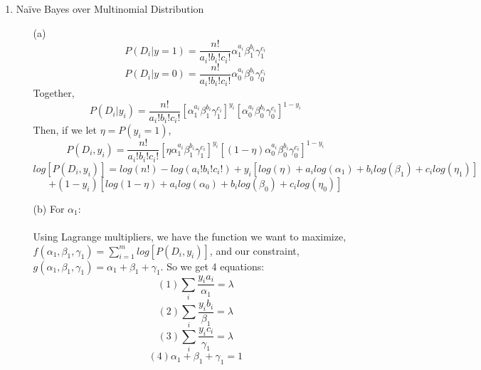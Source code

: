 \begin{enumerate}
\begin{enumerate}
  \item[(d)]
    No, they're not. You can't assign a probability of a label just given one feature by itself. For example, in this formulation, we assume that $P(x_1|0)$ is independent of $P(x_2|0)$. This means that $P(0|x_1)$ is independent of $P(0|x_2)$. But we can't really get the probability of a label given just one feature's information. A more fair calculation of $P(0|x_1)$ would include all of the other features' values. For example, if there were already 3 other features with values of 1, $P(0|x_1)$ should always be 0, regardless of the value of $x_1$. \\\\
In a more hand-wavy explanation, because the value is just dependent on a certain threshold number of features being on, it'll always be 1 regardless of the remaining features. This means that the remaining features should have no affect on the final output, but with the Na{\"i}ve Bayes assumptions, they \textbf{will} have an affect.
  \end{enumerate}
\item Na{\"i}ve Bayes over Multinomial Distribution
  \begin{enumerate}
  \item [(a)]
    $$P(D_i|y=1) = \frac{n!}{a_i!b_i!c_i!}\alpha_1^{a_i}\beta_1^{b_i}\gamma_1^{c_i}$$
    $$P(D_i|y=0) = \frac{n!}{a_i!b_i!c_i!}\alpha_0^{a_i}\beta_0^{b_i}\gamma_0^{c_i}$$
    Together,
    $$P(D_i|y_i) = \frac{n!}{a_i!b_i!c_i!}[\alpha_1^{a_i}\beta_1^{b_i}\gamma_1^{c_i}]^{y_i}[\alpha_0^{a_i}\beta_0^{b_i}\gamma_0^{c_i}]^{1-y_i}$$
    Then, if we let $\eta = P(y_i=1)$,
    $$P(D_i,y_i) = \frac{n!}{a_i!b_i!c_i!}[\eta\alpha_1^{a_i}\beta_1^{b_i}\gamma_1^{c_i}]^{y_i}[(1-\eta)\alpha_0^{a_i}\beta_0^{b_i}\gamma_0^{c_i}]^{1-y_i}$$
    $$log[P(D_i,y_i)] = log(n!) - log(a_i!b_i!c_i!) + y_i[log(\eta) + a_ilog(\alpha_1)+b_ilog(\beta_1)+c_ilog(\eta_1)]$$
    $$+ (1-y_i)[log(1-\eta)+a_ilog(\alpha_0)+b_ilog(\beta_0)+c_ilog(\eta_0)]$$
  \item [(b)]
    For $\alpha_1$:\\\\
    Using Lagrange multipliers, we have the function we want to maximize, $f(\alpha_1,\beta_1,\gamma_1) = \sum_{i=1}^m log[P(D_i,y_i)]$, and our constraint, $g(\alpha_1,\beta_1,\gamma_1) = \alpha_1 + \beta_1 + \gamma_1$. So we get 4 equations:
    $$(1) \sum_i \frac{y_ia_i}{\alpha_1}= \lambda$$
    $$(2) \sum_i \frac{y_ib_i}{\beta_1}= \lambda$$
    $$(3) \sum_i \frac{y_ic_i}{\gamma_1}= \lambda$$
    $$(4) \alpha_1 + \beta_1 + \gamma_1 = 1$$

\end{enumerate}
\end{enumerate}

